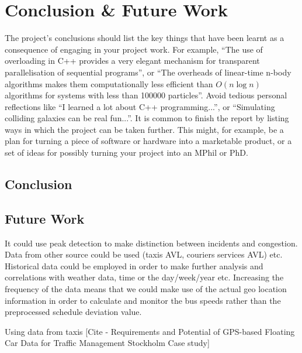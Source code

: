 \chapter{Conclusion \& Future Work}

The project's conclusions should list the key things that have been learnt as a consequence of engaging in your project work. For example, ``The use of overloading in C++ provides a very elegant mechanism for transparent parallelisation of sequential programs'', or ``The overheads of linear-time n-body algorithms makes them computationally less efficient than $O(n \log n)$ algorithms for systems with less than 100000 particles''. Avoid tedious personal reflections like ``I learned a lot about C++ programming...'', or ``Simulating colliding galaxies can be real fun...''. It is common to finish the report by listing ways in which the project can be taken further. This might, for example, be a plan for turning a piece of software or hardware into a marketable product, or a set of ideas for possibly turning your project into an MPhil or PhD.

\section{Conclusion}

\section{Future Work}
It could use peak detection to make distinction between incidents and congestion.
Data from other source could be used (taxis AVL, couriers services AVL) etc.
Historical data could be employed in order to make further analysis and correlations with weather data, time or the day/week/year etc.
Increasing the frequency of the data means that we could make use of the actual geo location information in order to calculate and monitor the bus speeds rather than the preprocessed schedule deviation value.

Using data from taxis [Cite - Requirements and Potential of GPS-based Floating Car Data for Traffic Management Stockholm Case study]